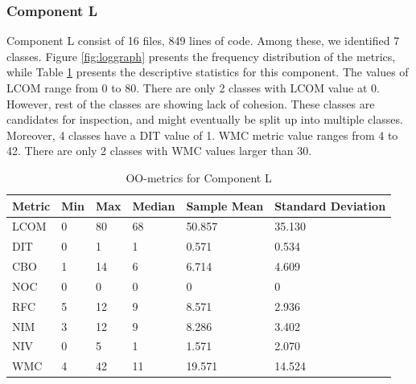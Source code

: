 \subsubsection{Component L}
Component L consist of 16 files, 849 lines of code. Among these, we identified 7 classes. Figure \ref{fig:loggraph} presents the frequency distribution of the metrics, while Table \ref{tab:oometrics-log} presents the descriptive statistics for this component. The values of LCOM range from 0 to 80. There are only 2 classes with LCOM value at 0. However, rest of the classes are showing lack of cohesion. These classes are candidates for inspection, and might eventually be split up into multiple classes. Moreover, 4 classes have a DIT value of 1. WMC metric value ranges from 4 to 42. There are only 2 classes with WMC values larger than 30.

\begin{table}[]
\centering
\caption{OO-metrics for Component L}
\label{tab:oometrics-log}
\begin{tabular}{|l|l|l|l|l|l|}
\hline
\textbf{Metric} & \textbf{Min} & \textbf{Max} & \textbf{Median} & \textbf{Sample Mean} & \textbf{Standard Deviation} \\ \hline
LCOM            & 0            & 80           & 68              & 50.857               & 35.130                      \\ \hline
DIT             & 0            & 1            & 1               & 0.571                & 0.534                       \\ \hline
CBO             & 1            & 14           & 6               & 6.714                & 4.609                       \\ \hline
NOC             & 0            & 0            & 0               & 0                    & 0                           \\ \hline
RFC             & 5            & 12           & 9               & 8.571                & 2.936                       \\ \hline
NIM             & 3            & 12           & 9               & 8.286                & 3.402                       \\ \hline
NIV             & 0            & 5            & 1               & 1.571                & 2.070                       \\ \hline
WMC            & 4            & 42          & 11              & 19.571                 & 14.524                      \\ \hline
\end{tabular}
\end{table}




